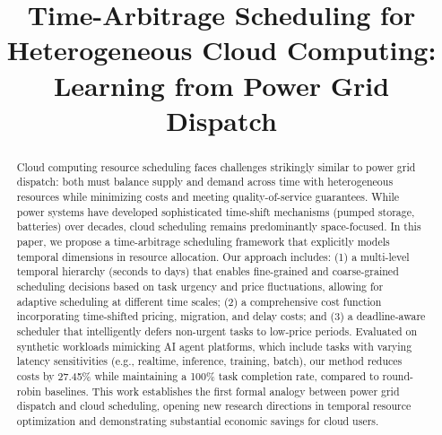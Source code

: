 \documentclass[10pt,conference]{IEEEtran}
\begin{document}
\title{Time-Arbitrage Scheduling for Heterogeneous Cloud Computing: Learning from Power Grid Dispatch}

\author{
    \and
}

\maketitle

\begin{abstract}
Cloud computing resource scheduling faces challenges strikingly similar to power grid dispatch: both must balance supply and demand across time with heterogeneous resources while minimizing costs and meeting quality-of-service guarantees. While power systems have developed sophisticated time-shift mechanisms (pumped storage, batteries) over decades, cloud scheduling remains predominantly space-focused. In this paper, we propose a time-arbitrage scheduling framework that explicitly models temporal dimensions in resource allocation. Our approach includes: (1) a multi-level temporal hierarchy (seconds to days) that enables fine-grained and coarse-grained scheduling decisions based on task urgency and price fluctuations, allowing for adaptive scheduling at different time scales; (2) a comprehensive cost function incorporating time-shifted pricing, migration, and delay costs; and (3) a deadline-aware scheduler that intelligently defers non-urgent tasks to low-price periods. Evaluated on synthetic workloads mimicking AI agent platforms, which include tasks with varying latency sensitivities (e.g., realtime, inference, training, batch), our method reduces costs by 27.45\% while maintaining a 100\% task completion rate, compared to round-robin baselines. This work establishes the first formal analogy between power grid dispatch and cloud scheduling, opening new research directions in temporal resource optimization and demonstrating substantial economic savings for cloud users.
\end{abstract}
\end{document}
